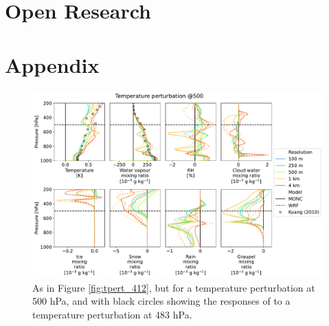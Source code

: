 \documentclass[draft]{agujournal2019}
\begin{document}
\section{Open Research}



%



\newpage
\section*{Appendix}
\setcounter{figure}{0}
\renewcommand{\thefigure}{A\arabic{figure}}

\begin{figure}[pth]
    \noindent\includegraphics[width=\textwidth]{figures/pert_diffs_T_0.5_@500}
    \caption{As in Figure \ref{fig:tpert_412}, but for a temperature
    perturbation at 500 hPa, and with black circles showing the responses of
     to a temperature perturbation at 483 hPa.}
    \label{fig:tpert_500}
\end{figure}
\end{document}
